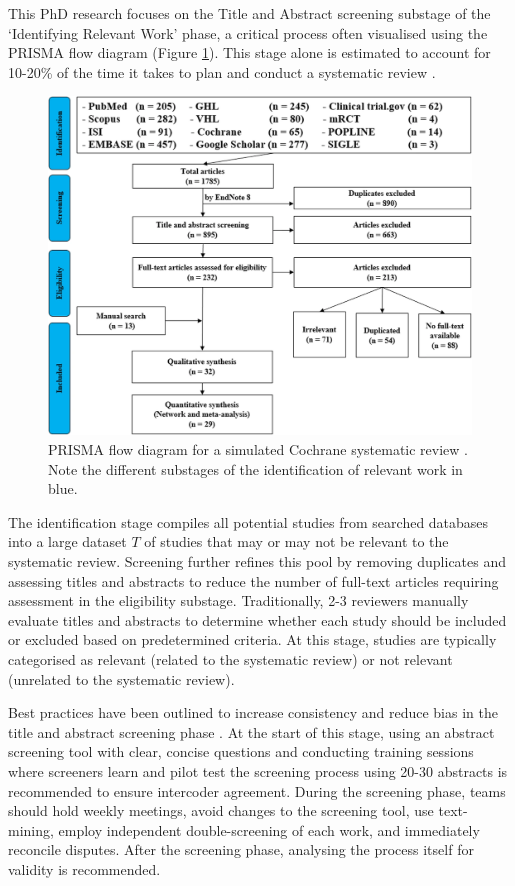 \documentclass[10pt,oneside]{book}
\begin{document}
This PhD research focuses on the Title and Abstract screening substage of the `Identifying Relevant Work' phase, a critical process often visualised using the PRISMA flow diagram (Figure \ref{fig:prisma_flow}). This stage alone is estimated  to account for 10-20\% of the time it takes to plan and conduct a systematic review \cite{haddaway_predicting_2019}.

\begin{figure}
    \centering
    \includegraphics[width=0.5\linewidth]{Confirmation Review//images/prisma_flow.png}
    \caption{PRISMA flow diagram for a simulated Cochrane systematic review \cite{tawfik_protocol_2020}. Note the different substages of the identification of relevant work in blue.}
    \label{fig:prisma_flow}
\end{figure}

The identification stage compiles all potential studies from searched databases into a large dataset $T$ of studies that may or may not be relevant to the systematic review. Screening further refines this pool by removing duplicates and assessing titles and abstracts to reduce the number of full-text articles requiring assessment in the eligibility substage. Traditionally, 2-3 reviewers manually evaluate titles and abstracts to determine whether each study should be included or excluded based on predetermined criteria. At this stage, studies are typically categorised as relevant (related to the systematic review) or not relevant (unrelated to the systematic review).


Best practices have been outlined to increase consistency and reduce bias in the title and abstract screening phase \cite{polanin_best_2019}. At the start of this stage, using an abstract screening tool with clear, concise questions and conducting training sessions where screeners learn and pilot test the screening process using 20-30 abstracts is recommended to ensure intercoder agreement. During the screening phase, teams should hold weekly meetings, avoid changes to the screening tool, use text-mining, employ independent double-screening of each work, and immediately reconcile disputes. After the screening phase, analysing the process itself for validity is recommended.
\end{document}
